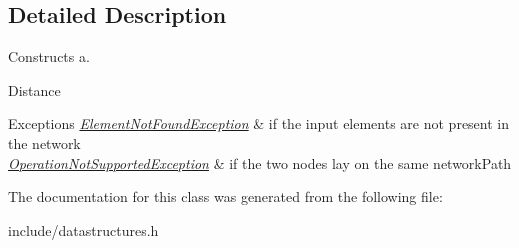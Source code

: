 \subsection{Detailed Description}
Constructs a. 

Distance 
\begin{DoxyExceptions}{Exceptions}
{\em \hyperlink{class_element_not_found_exception}{Element\+Not\+Found\+Exception}} & if the input elements are not present in the network \\
\hline
{\em \hyperlink{class_operation_not_supported_exception}{Operation\+Not\+Supported\+Exception}} & if the two nodes lay on the same network\+Path \\
\hline
\end{DoxyExceptions}


The documentation for this class was generated from the following file\+:\begin{DoxyCompactItemize}
\item 
include/datastructures.\+h\end{DoxyCompactItemize}

